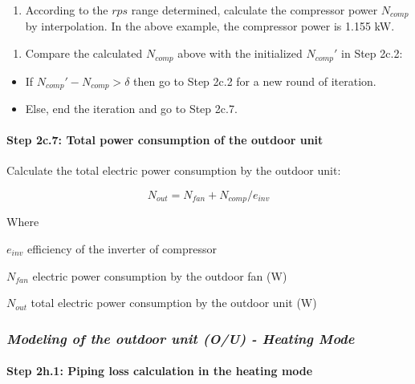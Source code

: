 \begin{enumerate}
\def\labelenumi{\alph{enumi}.}
\setcounter{enumi}{1}
\tightlist
\item
  According to the \(rps\) range determined, calculate the compressor power \(N_{comp}\) by interpolation. In the above example, the compressor power is 1.155 kW. 
\end{enumerate}

\begin{enumerate}
\def\labelenumi{(\arabic{enumi})}
\setcounter{enumi}{1}
\tightlist
\item
  Compare the calculated \(N_{comp}\) above with the initialized \({N_{comp}}'\) in Step 2c.2:
\end{enumerate}

\begin{itemize}
\item
  If \({N_{comp}}'-N_{comp}>\delta\) then go to Step 2c.2 for a new round of iteration.
\item
  Else, end the iteration and go to Step 2c.7.
\end{itemize}

\paragraph{Step 2c.7: Total power consumption of the outdoor unit}\label{step-2c.7-total-power-consumption-of-the-outdoor-unit}

Calculate the total electric power consumption by the outdoor unit:

\begin{equation}
N_{out} = N_{fan}+N_{comp}/e_{inv}
\end{equation}

Where

\(e_{inv}\) efficiency of the inverter of compressor

\(N_{fan}\) electric power consumption by the outdoor fan (W)

\(N_{out}\) total electric power consumption by the outdoor unit (W)

\subsubsection{\texorpdfstring{\emph{Modeling of the outdoor unit (O/U) - Heating Mode}}{Modeling of the outdoor unit (O/U) - Heating Mode}}\label{modeling-of-the-outdoor-unit-ou---heating-mode}

\paragraph{Step 2h.1: Piping loss calculation in the heating mode}\label{step-2h.1-piping-loss-calculation-in-the-heating-mode}

